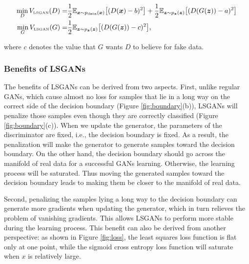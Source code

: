 \begin{equation}
\label{eq:lsgan}
\begin{split}
\min_D V_{\text{\tiny LSGAN}}(D) = &\frac{1}{2}\mathbb{E}_{\bm{x} \sim p_{\text{data}}(\bm{x})}\bigl[(D(\bm{x})-b)^2\bigr]+ \frac{1}{2}\mathbb{E}_{\bm{z} \sim p_{\bm{z}}(\bm{z})}\bigl[(D(G(\bm{z}))-a)^2\bigr] \\
\min_G V_{\text{\tiny LSGAN}}(G) = &\frac{1}{2}\mathbb{E}_{\bm{z} \sim p_{\bm{z}}(\bm{z})}\bigl[(D(G(\bm{z}))-c)^2\bigr],
\end{split}
\end{equation}


where $c$ denotes the value that $G$ wants $D$ to believe for fake data.



\subsubsection{Benefits of LSGANs}
The benefits of LSGANs can be derived from two aspects. First, unlike regular GANs, which cause almost no loss for samples that lie in a long way on the correct side of the decision boundary (Figure \ref{fig:boundary}(b)), LSGANs will penalize those samples even though they are correctly classified (Figure \ref{fig:boundary}(c)). When we update the generator, the parameters of the discriminator are fixed, i.e., the decision boundary is fixed. As a result, the penalization will make the generator to generate samples toward the decision boundary. On the other hand, the decision boundary should go across the manifold of real data for a successful GANs learning. Otherwise, the learning process will be saturated. Thus moving the generated samples toward the decision boundary leads to making them be closer to the manifold of real data. 

Second, penalizing the samples lying a long way to the decision boundary can generate more gradients when updating the generator, which in turn relieves the problem of vanishing gradients. This allows LSGANs to perform more stable during the learning process. This benefit can also be derived from another perspective: as shown in Figure \ref{fig:loss}, the least squares loss function is flat only at one point, while the sigmoid cross entropy loss function will saturate when $x$ is relatively large.


